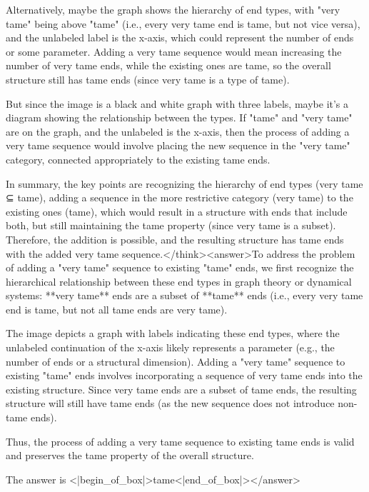 Alternatively, maybe the graph shows the hierarchy of end types, with "very tame" being above "tame" (i.e., every very tame end is tame, but not vice versa), and the unlabeled label is the x-axis, which could represent the number of ends or some parameter. Adding a very tame sequence would mean increasing the number of very tame ends, while the existing ones are tame, so the overall structure still has tame ends (since very tame is a type of tame).

But since the image is a black and white graph with three labels, maybe it's a diagram showing the relationship between the types. If "tame" and "very tame" are on the graph, and the unlabeled is the x-axis, then the process of adding a very tame sequence would involve placing the new sequence in the "very tame" category, connected appropriately to the existing tame ends.

In summary, the key points are recognizing the hierarchy of end types (very tame ⊆ tame), adding a sequence in the more restrictive category (very tame) to the existing ones (tame), which would result in a structure with ends that include both, but still maintaining the tame property (since very tame is a subset). Therefore, the addition is possible, and the resulting structure has tame ends with the added very tame sequence.</think><answer>To address the problem of adding a "very tame" sequence to existing "tame" ends, we first recognize the hierarchical relationship between these end types in graph theory or dynamical systems: **very tame** ends are a subset of **tame** ends (i.e., every very tame end is tame, but not all tame ends are very tame).  

The image depicts a graph with labels indicating these end types, where the unlabeled continuation of the x-axis likely represents a parameter (e.g., the number of ends or a structural dimension). Adding a "very tame" sequence to existing "tame" ends involves incorporating a sequence of very tame ends into the existing structure. Since very tame ends are a subset of tame ends, the resulting structure will still have tame ends (as the new sequence does not introduce non-tame ends).  

Thus, the process of adding a very tame sequence to existing tame ends is valid and preserves the tame property of the overall structure.  

The answer is <|begin_of_box|>tame<|end_of_box|></answer>